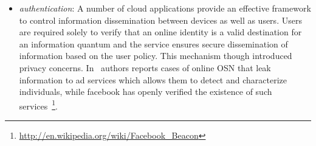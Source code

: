 \begin{itemize}
  \item{\it authentication}: A number of cloud applications provide an effective
       framework to control information dissemination between devices as well as
       users.  Users are required solely to verify that an online identity is a
       valid destination for an information quantum and the service ensures
       secure dissemination of information based on the user policy.  This
       mechanism though introduced privacy concerns.
       In~\cite{Krishnamurthy2009} authors reports cases of online OSN that leak
       information to ad services which allows them to detect and characterize
       individuals, while facebook has openly verified the existence of such
       services~\footnote{\url{http://en.wikipedia.org/wiki/Facebook_Beacon}}. 



\end{itemize}
